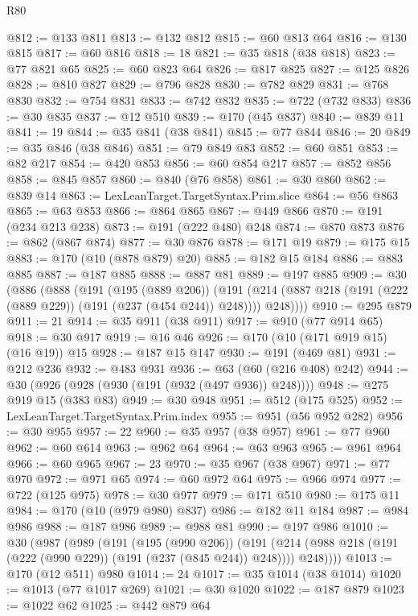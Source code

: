 \begin{lexlean}{R80}
\begin{coremodule}
@812 := @133 @811
@813 := @132 @812
@815 := @60 @813 @64
@816 := @130 @815
@817 := @60 @816
@818 := 18
@821 := @35 @818 (@38 @818)
@823 := @77 @821 @65
@825 := @60 @823 @64
@826 := @817 @825
@827 := @125 @826
@828 := @810 @827
@829 := @796 @828
@830 := @782 @829
@831 := @768 @830
@832 := @754 @831
@833 := @742 @832
@835 := @722 (@732 @833)
@836 := @30 @835
@837 := @12 @510
@839 := @170 (@45 @837)
@840 := @839 @11
@841 := 19
@844 := @35 @841 (@38 @841)
@845 := @77 @844
@846 := 20
@849 := @35 @846 (@38 @846)
@851 := @79 @849 @83
@852 := @60 @851
@853 := @82 @217
@854 := @420 @853
@856 := @60 @854 @217
@857 := @852 @856
@858 := @845 @857
@860 := @840 (@76 @858)
@861 := @30 @860
@862 := @839 @14
@863 := LexLeanTarget.TargetSyntax.Prim.slice
@864 := @56 @863
@865 := @63 @853
@866 := @864 @865
@867 := @449 @866
@870 := @191 (@234 @213 @238)
@873 := @191 (@222 @480) @248
@874 := @870 @873
@876 := @862 (@867 @874)
@877 := @30 @876
@878 := @171 @19
@879 := @175 @15
@883 := @170 (@10 (@878 @879) @20)
@885 := @182 @15 @184
@886 := @883 @885
@887 := @187 @885
@888 := @887 @81
@889 := @197 @885
@909 := @30
    (@886
      (@888
        (@191
          (@195 (@889 @206))
          (@191 (@214 (@887 @218 (@191 (@222 (@889 @229)) (@191 (@237 (@454 @244)) @248)))) @248))))
@910 := @295 @879
@911 := 21
@914 := @35 @911 (@38 @911)
@917 := @910 (@77 @914 @65)
@918 := @30 @917
@919 := @16 @46
@926 := @170 (@10 (@171 @919 @15) (@16 @19)) @15
@928 := @187 @15 @147
@930 := @191 (@469 @81)
@931 := @212 @236
@932 := @483 @931
@936 := @63 (@60 (@216 @408) @242)
@944 := @30 (@926 (@928 (@930 (@191 (@932 (@497 @936)) @248))))
@948 := @275 @919 @15 (@383 @83)
@949 := @30 @948
@951 := @512 (@175 @525)
@952 := LexLeanTarget.TargetSyntax.Prim.index
@955 := @951 (@56 @952 @282)
@956 := @30 @955
@957 := 22
@960 := @35 @957 (@38 @957)
@961 := @77 @960
@962 := @60 @614
@963 := @962 @64
@964 := @63 @963
@965 := @961 @964
@966 := @60 @965
@967 := 23
@970 := @35 @967 (@38 @967)
@971 := @77 @970
@972 := @971 @65
@974 := @60 @972 @64
@975 := @966 @974
@977 := @722 (@125 @975)
@978 := @30 @977
@979 := @171 @510
@980 := @175 @11
@984 := @170 (@10 (@979 @980) @837)
@986 := @182 @11 @184
@987 := @984 @986
@988 := @187 @986
@989 := @988 @81
@990 := @197 @986
@1010 := @30
    (@987
      (@989
        (@191
          (@195 (@990 @206))
          (@191 (@214 (@988 @218 (@191 (@222 (@990 @229)) (@191 (@237 (@845 @244)) @248)))) @248))))
@1013 := @170 (@12 @511) @980
@1014 := 24
@1017 := @35 @1014 (@38 @1014)
@1020 := @1013 (@77 @1017 @269)
@1021 := @30 @1020
@1022 := @187 @879
@1023 := @1022 @62
@1025 := @442 @879 @64

\end{coremodule}
\end{lexlean}
